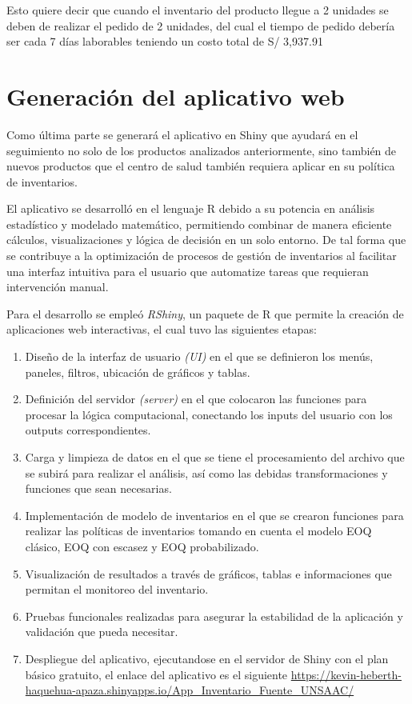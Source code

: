 Esto quiere decir que cuando el inventario del producto llegue a 2 unidades se deben de realizar el pedido de 2 unidades, del cual el tiempo de pedido debería ser cada 7 días laborables teniendo un costo total de S/ 3,937.91

\section{Generación del aplicativo web}
Como última parte se generará el aplicativo en Shiny que ayudará en el seguimiento no solo de los productos analizados anteriormente, sino también de nuevos productos que el centro de salud también requiera aplicar en su política de inventarios.

El aplicativo se desarrolló en el lenguaje R debido a su potencia en análisis estadístico y modelado matemático, permitiendo combinar de manera eficiente cálculos, visualizaciones y lógica de decisión en un solo entorno. De tal forma que se contribuye a la optimización de procesos de gestión de inventarios al facilitar una interfaz intuitiva para el usuario que automatize tareas que requieran intervención manual.

Para el desarrollo se empleó \textsl{RShiny}, un paquete de R que permite la creación de aplicaciones web interactivas, el cual tuvo las siguientes etapas:

\begin{enumerate}
    \item Diseño de la interfaz de usuario \textsl{(UI)} en el que se definieron los menús, paneles, filtros, ubicación de gráficos y tablas.
    \item Definición del servidor \textsl{(server)} en el que colocaron las funciones para procesar la lógica computacional, conectando los inputs del usuario con los outputs correspondientes.
    \item Carga y limpieza de datos en el que se tiene el procesamiento del archivo que se subirá para realizar el análisis, así como las debidas transformaciones y funciones que sean necesarias.
    \item Implementación de modelo de inventarios en el que se crearon funciones para realizar las políticas de inventarios tomando en cuenta el modelo EOQ clásico, EOQ con escasez y EOQ probabilizado.
    \item Visualización de resultados a través de gráficos, tablas e informaciones que permitan el monitoreo del inventario.
    \item Pruebas funcionales realizadas para asegurar la estabilidad de la aplicación y validación que pueda necesitar.
    \item Despliegue del aplicativo, ejecutandose en el servidor de Shiny con el plan básico gratuito, el enlace del aplicativo es el siguiente \url{https://kevin-heberth-haquehua-apaza.shinyapps.io/App_Inventario_Fuente_UNSAAC/}
\end{enumerate}

